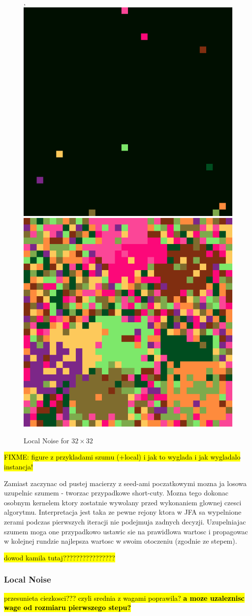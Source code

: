 \documentclass[format=acmsmall,screen,review,authordraft,nonacm]{acmart}
\begin{document}
\begin{figure}[H]
\begin{minipage}{0.48\textwidth}
		,
		\includegraphics[width=0.23\linewidth]{../figures/mod_lnoise_v2_2_in}
		\includegraphics[width=0.23\linewidth]{../figures/mod_lnoise_v2_2_out}
		\caption{Local Noise for $32 \times 32$}
		\label{Fig:lnoise}
	\end{minipage}
\end{figure}

\hl{FIXME: figure z przykladami szumu (+local) i jak to wyglada i jak wygladalo
instancja!}

Zamiast zaczynac od pustej macierzy z seed-ami poczatkowymi mozna ja losowa
uzupelnic szumem - tworzac przypadkowe short-cuty. Mozna tego dokonac osobnym
kernelem ktory zostatnie wywolany przed wykonaniem glownej czesci algorytmu.
Interpretacja jest taka ze pewne rejony ktora w JFA sa wypelnione zerami podczas
pierwszych iteracji nie podejmuja zadnych decyzji. Uzupelniajac szumem moga one
przypadkowo ustawic sie na prawidlowa wartosc i propagowac w kolejnej rundzie
najlepsza wartosc w swoim otoczeniu (zgodnie ze stepem).

\hl{dowod kamila tutaj????????????????}

\subsubsection{Local Noise} %

\hl{przesunieta ciezkosci??? czyli srednia z wagami poprawila? \textbf{a moze uzaleznisc
wage od rozmiaru pierwszego stepu?}}

\end{document}
